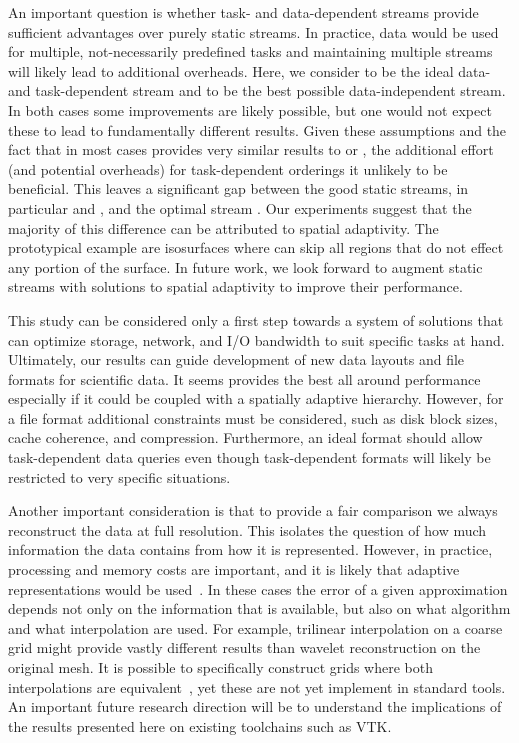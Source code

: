 An important question is whether task- and data-dependent streams provide sufficient advantages over
purely static streams. In practice, data would be used for multiple, not-necessarily predefined
tasks and maintaining multiple streams will likely lead to additional overheads. Here, we consider
\sopt to be the ideal data- and task-dependent stream and \ssig to be the best possible
data-independent stream. In both cases some improvements are likely possible, but one would not
expect these to lead to fundamentally different results. Given these assumptions and the fact that
\ssig in most cases provides very similar results to \sbit or \swav, the additional effort (and
potential overheads) for task-dependent orderings it unlikely to be beneficial. This leaves a
significant gap between the good static streams, in particular \swav and \sbit, and the optimal
stream \sopt. Our experiments suggest that the majority of this difference can be attributed to
spatial adaptivity. The prototypical example are isosurfaces where \sopt can skip all regions that
do not effect any portion of the surface. In future work, we look forward to augment static streams
with solutions to spatial adaptivity to improve their performance.

This study can be considered only a first step towards a system of solutions that can optimize
storage, network, and I/O bandwidth to suit specific tasks at hand. Ultimately, our results can
guide development of new data layouts and file formats for scientific data. It seems \swav provides
the best all around performance especially if it could be coupled with a spatially adaptive
hierarchy. However, for a file format additional constraints must be considered, such as disk block
sizes, cache coherence, and compression. Furthermore, an ideal format should allow task-dependent
data queries even though task-dependent formats will likely be restricted to very specific
situations. 

Another important consideration is that to provide a fair comparison we always reconstruct the data
at full resolution. This isolates the question of how much information the data contains from how it
is represented. However, in practice, processing and memory costs are important, and it is likely
that adaptive representations would be used~\cite{gigavoxels,Gobbetti2008,vdb2013}. In these cases
the error of a given approximation depends not only on the information that is available, but also
on what algorithm and what interpolation are used. For example, trilinear interpolation on a coarse
grid might provide vastly different results than wavelet reconstruction on the original mesh. It is
possible to specifically construct grids where both interpolations are equivalent~\cite{weiss}, yet
these are not yet implement in standard tools. An important future research direction will be to
understand the implications of the results presented here on existing toolchains such as VTK.

